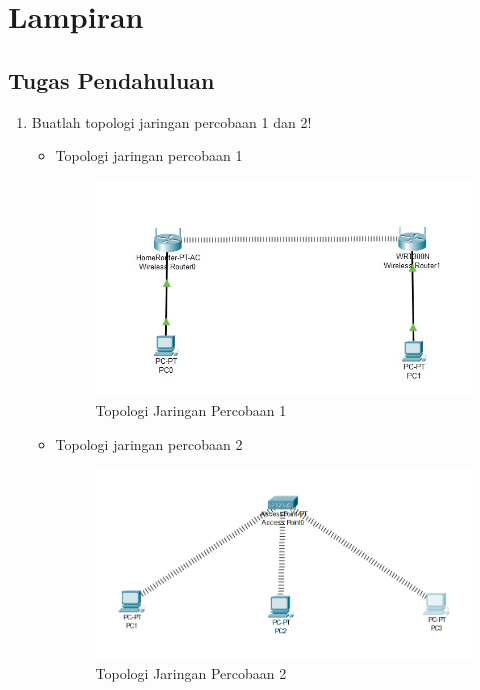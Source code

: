 \section{Lampiran}

\subsection{Tugas Pendahuluan}
\begin{enumerate}
	\item Buatlah topologi jaringan percobaan 1 dan 2!
	\begin{itemize}
		\item Topologi jaringan percobaan 1
		\begin{figure}[H]
		\centering
		\includegraphics[width=0.7\linewidth]{P1/img/topologi1.jpg}
		\caption{Topologi Jaringan Percobaan 1}
		\label{fig:gambar31}
	\end{figure}


	\end{itemize}
	\begin{itemize}
		\item Topologi jaringan percobaan 2
		\begin{figure}[H]
			\centering
			\includegraphics[width=0.7\linewidth]{P1/img/topologi2.png}
			\caption{Topologi Jaringan Percobaan 2}
			\label{fig:gambar32}
		\end{figure}
	\end{itemize}


\end{enumerate}
